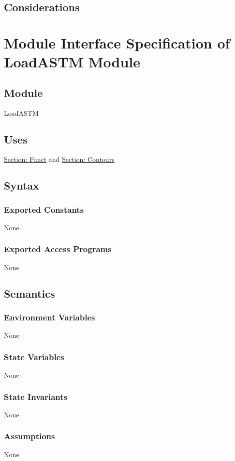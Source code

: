 \documentclass[12pt]{article}
\begin{document}
\subsection{Considerations}
\label{Sec:Considerations}
\section{Module Interface Specification of LoadASTM Module}
\label{Sec:LoadASTM}
\subsection{Module}
\label{Sec:Module}
LoadASTM
\subsection{Uses}
\label{Sec:Uses}
\hyperref[Sec:FunctADT]{Section: Funct} and \hyperref[Sec:ContoursADT]{Section: Contours}
\subsection{Syntax}
\label{Sec:Syntax}
\subsubsection{Exported Constants}
\label{Sec:ExpConstants}
None
\subsubsection{Exported Access Programs}
\label{Sec:ExpAccPrograms}
None
\subsection{Semantics}
\label{Sec:Semantics}
\subsubsection{Environment Variables}
\label{Sec:EnviroVars}
None
\subsubsection{State Variables}
\label{Sec:StateVars}
None
\subsubsection{State Invariants}
\label{Sec:StateInvars}
None
\subsubsection{Assumptions}
\label{Sec:Assumps}
None
\end{document}
